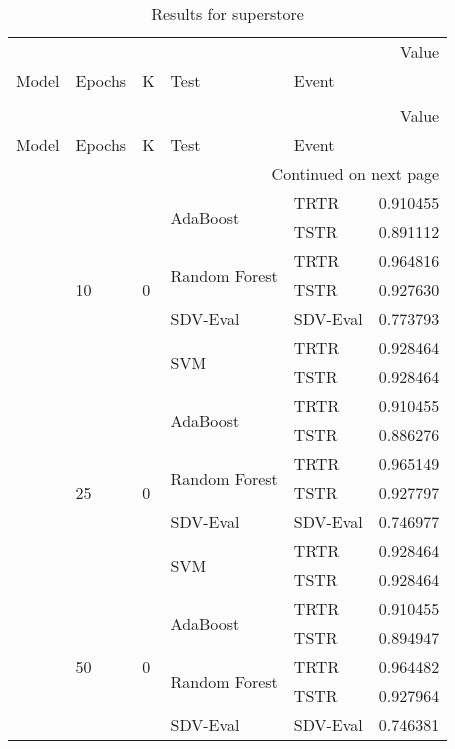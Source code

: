 \begin{longtable}{lllllr}
\caption{Results for superstore} \\
\toprule
 &  &  &  &  & Value \\
Model & Epochs & K & Test & Event &  \\
\midrule
\endfirsthead
\caption[]{Results for superstore} \\
\toprule
 &  &  &  &  & Value \\
Model & Epochs & K & Test & Event &  \\
\midrule
\endhead
\midrule
\multicolumn{6}{r}{Continued on next page} \\
\midrule
\endfoot
\bottomrule
\endlastfoot
\multirow[t]{35}{*}{CTGAN} & \multirow[t]{7}{*}{10} & \multirow[t]{7}{*}{0} & \multirow[t]{2}{*}{AdaBoost} & TRTR & 0.910455 \\
 &  &  &  & TSTR & 0.891112 \\
\cline{4-6}
 &  &  & \multirow[t]{2}{*}{Random Forest} & TRTR & 0.964816 \\
 &  &  &  & TSTR & 0.927630 \\
\cline{4-6}
 &  &  & SDV-Eval & SDV-Eval & 0.773793 \\
\cline{4-6}
 &  &  & \multirow[t]{2}{*}{SVM} & TRTR & 0.928464 \\
 &  &  &  & TSTR & 0.928464 \\
\cline{2-6} \cline{3-6} \cline{4-6}
 & \multirow[t]{7}{*}{25} & \multirow[t]{7}{*}{0} & \multirow[t]{2}{*}{AdaBoost} & TRTR & 0.910455 \\
 &  &  &  & TSTR & 0.886276 \\
\cline{4-6}
 &  &  & \multirow[t]{2}{*}{Random Forest} & TRTR & 0.965149 \\
 &  &  &  & TSTR & 0.927797 \\
\cline{4-6}
 &  &  & SDV-Eval & SDV-Eval & 0.746977 \\
\cline{4-6}
 &  &  & \multirow[t]{2}{*}{SVM} & TRTR & 0.928464 \\
 &  &  &  & TSTR & 0.928464 \\
\cline{2-6} \cline{3-6} \cline{4-6}
 & \multirow[t]{7}{*}{50} & \multirow[t]{7}{*}{0} & \multirow[t]{2}{*}{AdaBoost} & TRTR & 0.910455 \\
 &  &  &  & TSTR & 0.894947 \\
\cline{4-6}
 &  &  & \multirow[t]{2}{*}{Random Forest} & TRTR & 0.964482 \\
 &  &  &  & TSTR & 0.927964 \\
\cline{4-6}
 &  &  & SDV-Eval & SDV-Eval & 0.746381 \\

\end{longtable}
